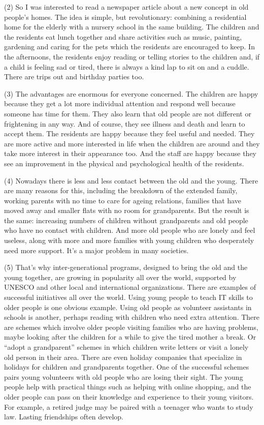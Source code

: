 \documentclass[UTF8,11pt]{ctexart}
\begin{document}
(2) So I was interested to read a newspaper article about a new concept in old people’s homes. The idea is simple, but revolutionary: combining a residential home for the elderly with a nursery school in the same building. The children and the residents eat lunch together and share activities such as music, painting, gardening and caring for the pets which the residents are encouraged to keep. In the afternoons, the residents enjoy reading or telling stories to the children and, if a child is feeling sad or tired, there is always a kind lap to sit on and a cuddle. There are trips out and birthday parties too.


(3) The advantages are enormous for everyone concerned. The children are happy because they get a lot more individual attention and respond well because someone has time for them. They also learn that old people are not different or frightening in any way. And of course, they see illness and death and learn to accept them. The residents are happy because they feel useful and needed. They are more active and more interested in life when the children are around and they take more interest in their appearance too. And the staff are happy because they see an improvement in the physical and psychological health of the residents.


(4) Nowadays there is less and less contact between the old and the young. There are many reasons for this, including the breakdown of the extended family, working parents with no time to care for ageing relations, families that have moved away and smaller flats with no room for grandparents. But the result is the same: increasing numbers of children without grandparents and old people who have no contact with children. And more old people who are lonely and feel useless, along with more and more families with young children who desperately need more support. It’s a major problem in many societies.


(5) That’s why inter-generational programs, designed to bring the old and the young together, are growing in popularity all over the world, supported by UNESCO and other local and international organizations. There are examples of successful initiatives all over the world. Using young people to teach IT skills to older people is one obvious example. Using old people as volunteer assistants in schools is another, perhaps reading with children who need extra attention. There are schemes which involve older people visiting families who are having problems, maybe looking after the children for a while to give the tired mother a break. Or “adopt a grandparent” schemes in which children write letters or visit a lonely old person in their area. There are even holiday companies that specialize in holidays for children and grandparents together. One of the successful schemes pairs young volunteers with old people who are losing their sight. The young people help with practical things such as helping with online shopping, and the older people can pass on their knowledge and experience to their young visitors. For example, a retired judge may be paired with a teenager who wants to study law. Lasting friendships often develop.
\end{document}

